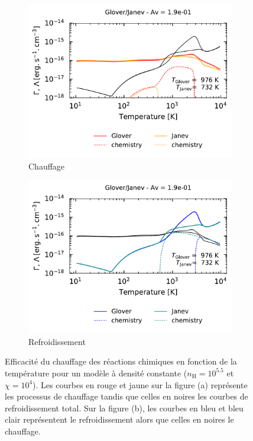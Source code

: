 \begin{figure}[!h]
    \centering
    \begin{subfigure}[t]{0.49\textwidth} %
        \centering \includegraphics[trim = {0 0 0 1cm },clip,width=1\textwidth]{figure/H2/bosse_dcte_janevVSglover/GCcomp_h_1p9em01.pdf}
        \caption{Chauffage}
    \end{subfigure}
    \begin{subfigure}[t]{0.49\textwidth}
        \centering \includegraphics[trim = {0 0 0 1cm },clip,width=1\textwidth]{figure/H2/bosse_dcte_janevVSglover/GCcomp_c_1p9em01.pdf}
        \caption{Refroidissement}
    \end{subfigure}
    \caption{Efficacité du chauffage des réactions chimiques en fonction de la température pour un modèle à densité constante ($n_\mathrm{H} = 10^{5.5}$ et $\chi = 10^4$). Les courbes en rouge et jaune sur la figure (a) représente les processus de chauffage tandis que celles en noires les courbes de refroidissement total. Sur la figure (b), les courbes en bleu et bleu clair représentent le refroidissement alors que celles en noires le chauffage.}
    \label{fig:H2:bosse:chem}
\end{figure}

